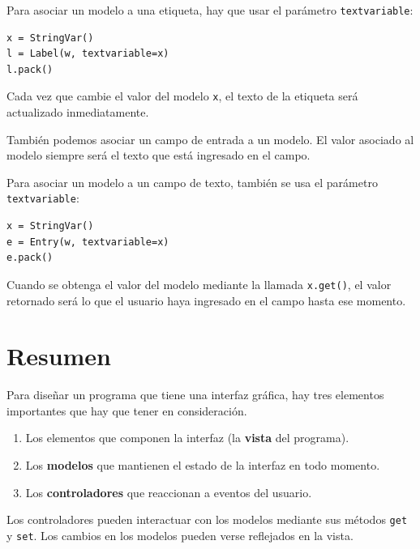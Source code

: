 Para asociar un modelo a una etiqueta, hay que usar el parámetro
\lstinline!textvariable!:

\begin{lstlisting}
x = StringVar()
l = Label(w, textvariable=x)
l.pack()
\end{lstlisting}

Cada vez que cambie el valor del modelo \lstinline!x!, el texto de la
etiqueta será actua\-li\-zado inmediatamente.

También podemos asociar un campo de entrada a un modelo. El valor
asociado al modelo siempre será el texto que está ingresado en el campo.

Para asociar un modelo a un campo de texto, también se usa el parámetro
\lstinline!textvariable!:

\begin{lstlisting}
x = StringVar()
e = Entry(w, textvariable=x)
e.pack()
\end{lstlisting}

Cuando se obtenga el valor del modelo mediante la llamada
\lstinline!x.get()!, el valor retornado será lo que el usuario haya
ingresado en el campo hasta ese momento.

\section{Resumen}

Para diseñar un programa que tiene una interfaz gráfica, hay tres
elementos importantes que hay que tener en consideración.

\begin{enumerate}
\item
  Los elementos que componen la interfaz (la \textbf{vista} del programa).
\item
  Los \textbf{modelos} que mantienen el estado de la interfaz en todo
  momento.
\item
  Los \textbf{controladores} que reaccionan a eventos del usuario.
\end{enumerate}

Los controladores pueden interactuar con los modelos mediante sus
métodos \lstinline!get! y \lstinline!set!. Los cambios en los modelos
pueden verse reflejados en la vista.
